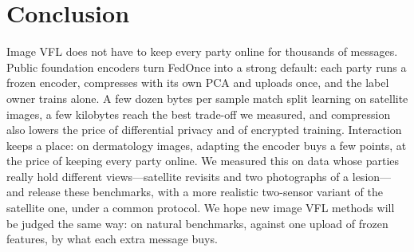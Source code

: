 \section{Conclusion}\label{sec:conclusion}
Image VFL does not have to keep every party online for thousands of messages. Public foundation encoders turn FedOnce into a strong default: each party runs a frozen encoder, compresses with its own PCA and uploads once, and the label owner trains alone. A few dozen bytes per sample match split learning on satellite images, a few kilobytes reach the best trade-off we measured, and compression also lowers the price of differential privacy and of encrypted training. Interaction keeps a place: on dermatology images, adapting the encoder buys a few points, at the price of keeping every party online. We measured this on data whose parties really hold different views---satellite revisits and two photographs of a lesion---and release these benchmarks, with a more realistic two-sensor variant of the satellite one, under a common protocol. We hope new image VFL methods will be judged the same way: on natural benchmarks, against one upload of frozen features, by what each extra message buys.
